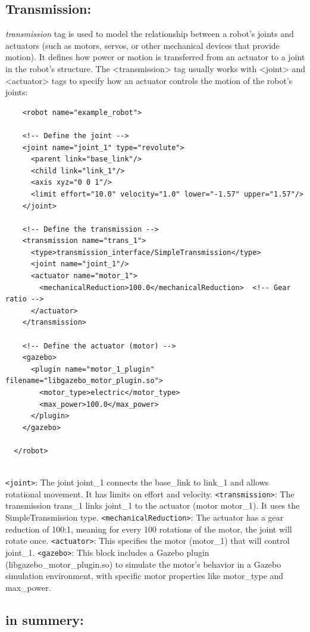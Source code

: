 \documentclass[../../main]{subfiles}
\begin{document}
\subsection{Transmission:}
\emph{transmission} tag is used to model the relationship between a robot's joints and actuators 
(such as motors, servos, or other mechanical devices that provide motion). 
It defines how power or motion is transferred from an actuator to a joint in the robot's structure.
The <transmission> tag usually works with <joint> and <actuator> tags to specify how an actuator controls the motion of the robot's joints:
\begin{verbatim}
    <robot name="example_robot">

    <!-- Define the joint -->
    <joint name="joint_1" type="revolute">
      <parent link="base_link"/>
      <child link="link_1"/>
      <axis xyz="0 0 1"/>
      <limit effort="10.0" velocity="1.0" lower="-1.57" upper="1.57"/>
    </joint>
  
    <!-- Define the transmission -->
    <transmission name="trans_1">
      <type>transmission_interface/SimpleTransmission</type>
      <joint name="joint_1"/>
      <actuator name="motor_1">
        <mechanicalReduction>100.0</mechanicalReduction>  <!-- Gear ratio -->
      </actuator>
    </transmission>
  
    <!-- Define the actuator (motor) -->
    <gazebo>
      <plugin name="motor_1_plugin" filename="libgazebo_motor_plugin.so">
        <motor_type>electric</motor_type>
        <max_power>100.0</max_power>
      </plugin>
    </gazebo>
  
  </robot>
  
\end{verbatim}
\lstinline!<joint>!: The joint joint\_1 connects the base\_link to link\_1 and allows rotational movement. 
It has limits on effort and velocity.
\lstinline!<transmission>!: The transmission trans\_1 links joint\_1 to the actuator (motor motor\_1). It uses the SimpleTransmission type.
\lstinline!<mechanicalReduction>!: The actuator has a gear reduction of 100:1, meaning for every 100 rotations of the motor, the joint will rotate once.
\lstinline!<actuator>!: This specifies the motor (motor\_1) that will control joint\_1.
\lstinline!<gazebo>!: This block includes a Gazebo plugin (libgazebo\_motor\_plugin.so) to simulate the motor’s behavior in a Gazebo simulation environment, with specific motor properties like motor\_type and max\_power.

\subsection*{in summery:}
\end{document}

